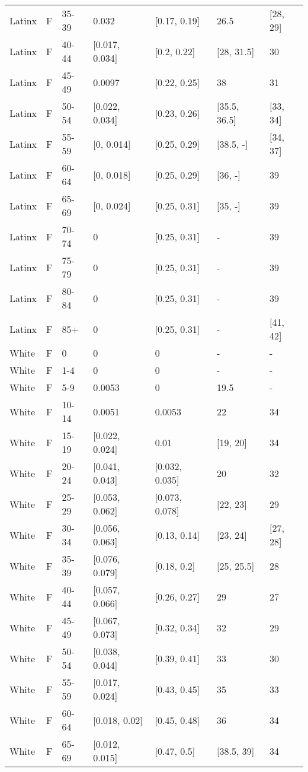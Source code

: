 \begin{table}[ht]
\begin{tabular}{lllllll}
  Latinx & F & 35-39 & 0.032 & [0.17, 0.19] & 26.5 & [28, 29] \\ 
  Latinx & F & 40-44 & [0.017, 0.034] & [0.2, 0.22] & [28, 31.5] & 30 \\ 
  Latinx & F & 45-49 & 0.0097 & [0.22, 0.25] & 38 & 31 \\ 
  Latinx & F & 50-54 & [0.022, 0.034] & [0.23, 0.26] & [35.5, 36.5] & [33, 34] \\ 
  Latinx & F & 55-59 & [0, 0.014] & [0.25, 0.29] & [38.5, -] & [34, 37] \\ 
  Latinx & F & 60-64 & [0, 0.018] & [0.25, 0.29] & [36, -] & 39 \\ 
  Latinx & F & 65-69 & [0, 0.024] & [0.25, 0.31] & [35, -] & 39 \\ 
  Latinx & F & 70-74 & 0 & [0.25, 0.31] & - & 39 \\ 
  Latinx & F & 75-79 & 0 & [0.25, 0.31] & - & 39 \\ 
  Latinx & F & 80-84 & 0 & [0.25, 0.31] & - & 39 \\ 
  Latinx & F & 85+ & 0 & [0.25, 0.31] & - & [41, 42] \\ 
  White & F & 0 & 0 & 0 & - & - \\ 
  White & F & 1-4 & 0 & 0 & - & - \\ 
  White & F & 5-9 & 0.0053 & 0 & 19.5 & - \\ 
  White & F & 10-14 & 0.0051 & 0.0053 & 22 & 34 \\ 
  White & F & 15-19 & [0.022, 0.024] & 0.01 & [19, 20] & 34 \\ 
  White & F & 20-24 & [0.041, 0.043] & [0.032, 0.035] & 20 & 32 \\ 
  White & F & 25-29 & [0.053, 0.062] & [0.073, 0.078] & [22, 23] & 29 \\ 
  White & F & 30-34 & [0.056, 0.063] & [0.13, 0.14] & [23, 24] & [27, 28] \\ 
  White & F & 35-39 & [0.076, 0.079] & [0.18, 0.2] & [25, 25.5] & 28 \\ 
  White & F & 40-44 & [0.057, 0.066] & [0.26, 0.27] & 29 & 27 \\ 
  White & F & 45-49 & [0.067, 0.073] & [0.32, 0.34] & 32 & 29 \\ 
  White & F & 50-54 & [0.038, 0.044] & [0.39, 0.41] & 33 & 30 \\ 
  White & F & 55-59 & [0.017, 0.024] & [0.43, 0.45] & 35 & 33 \\ 
  White & F & 60-64 & [0.018, 0.02] & [0.45, 0.48] & 36 & 34 \\ 
  White & F & 65-69 & [0.012, 0.015] & [0.47, 0.5] & [38.5, 39] & 34 \\ 

\end{tabular}
\end{table}
